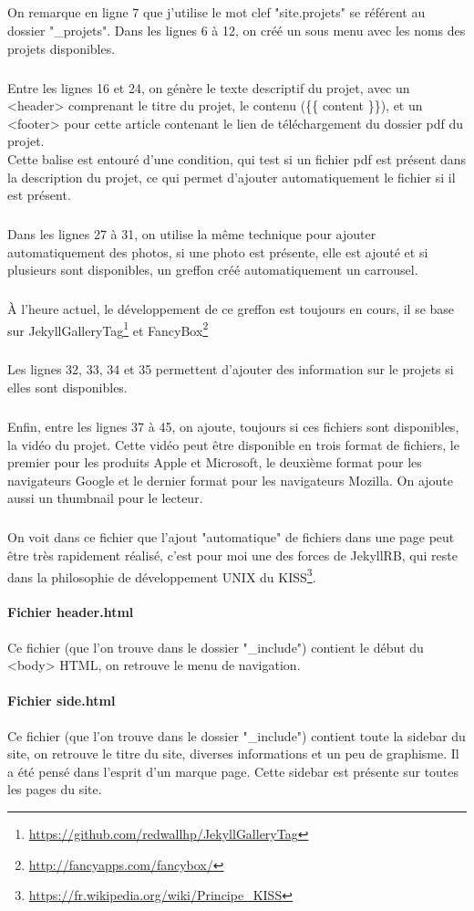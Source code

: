 \documentclass[11pt,a4paper,twoside]{report}
\begin{document}
				\subparagraph{}On remarque en ligne 7 que j'utilise le mot clef "site.projets" se référent au dossier "\_projets". Dans les lignes 6 à 12, on créé un sous menu avec les noms des projets disponibles.
				\subparagraph{}Entre les lignes 16 et 24, on génère le texte descriptif du projet, avec un <header> comprenant le titre du projet, le contenu (\{\{ content \}\}), et un <footer> pour cette article contenant le lien de téléchargement du dossier pdf du projet.\\
				Cette balise est entouré d'une condition, qui test si un fichier pdf est présent dans la description du projet, ce qui permet d'ajouter automatiquement le fichier si il est présent.
				\subparagraph{}Dans les lignes 27 à 31, on utilise la même technique pour ajouter automatiquement des photos, si une photo est présente, elle est ajouté et si plusieurs sont disponibles, un greffon créé automatiquement un carrousel.
				\subparagraph{}À l'heure actuel, le développement de ce greffon est toujours en cours, il se base sur JekyllGalleryTag\footnote{\url{https://github.com/redwallhp/JekyllGalleryTag}} et FancyBox\footnote{\url{http://fancyapps.com/fancybox/}}
				\subparagraph{}Les lignes 32, 33, 34 et 35 permettent d'ajouter des information sur le projets si elles sont disponibles.
				\subparagraph{}Enfin, entre les lignes 37 à 45, on ajoute, toujours si ces fichiers sont disponibles, la vidéo du projet. Cette vidéo peut être disponible en trois format de fichiers, le premier pour les produits Apple et Microsoft, le deuxième format pour les navigateurs Google et le dernier format pour les navigateurs Mozilla. On ajoute aussi un thumbnail pour le lecteur.
				\subparagraph{}On voit dans ce fichier que l'ajout "automatique" de fichiers dans une page peut être très rapidement réalisé, c'est pour moi une des forces de JekyllRB, qui reste dans la philosophie de développement UNIX du KISS\footnote{\url{https://fr.wikipedia.org/wiki/Principe_KISS}}.
			\paragraph{Fichier header.html}Ce fichier (que l'on trouve dans le dossier "\_include") contient le début du <body> HTML, on retrouve le menu de navigation.
			\paragraph{Fichier side.html}Ce fichier (que l'on trouve dans le dossier "\_include") contient toute la sidebar du site, on retrouve le titre du site, diverses informations et un peu de graphisme. Il a été pensé dans l'esprit d'un marque page. Cette sidebar est présente sur toutes les pages du site.
\end{document}
